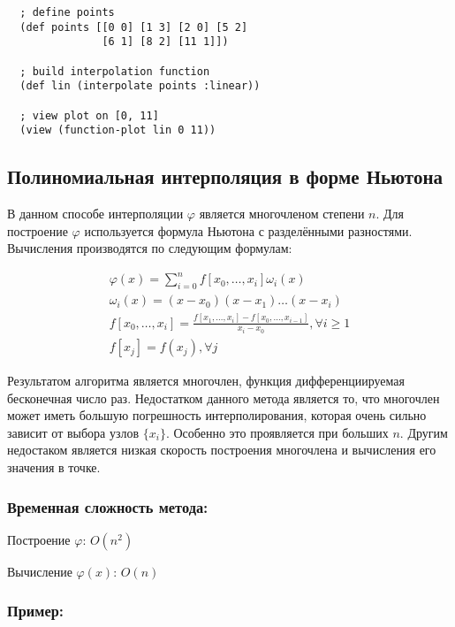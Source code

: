 \begin{verbatim}
  ; define points
  (def points [[0 0] [1 3] [2 0] [5 2] 
               [6 1] [8 2] [11 1]])

  ; build interpolation function
  (def lin (interpolate points :linear))

  ; view plot on [0, 11]
  (view (function-plot lin 0 11))
\end{verbatim}



\subsection{Полиномиальная интерполяция в форме Ньютона}

В данном способе интерполяции $\varphi$ является многочленом степени $n$. Для построение $\varphi$ используется формула Ньютона с разделёнными разностями. Вычисления производятся по следующим формулам:

\begin{equation}
  \begin{gathered}
    \varphi(x) = \sum_{i=0}^n f[x_0, \dotsc, x_i] \omega_i(x) \\
    \omega_i(x) = (x - x_0)(x - x_1) \dotsc (x - x_i) \\
    f[x_0, \dotsc, x_i] = \frac{f[x_1, \dotsc, x_i] - f[x_0, \dotsc, x_{i-1}]}{x_i - x_0}, \forall i \geq 1 \\
    f[x_j] = f(x_j), \forall j
  \end{gathered}
\end{equation}

Результатом алгоритма является многочлен, функция дифференциируемая бесконечная число раз. Недостатком данного метода является то, что многочлен может иметь большую погрешность интерполирования, которая очень сильно зависит от выбора узлов $\{x_i\}$. Особенно это проявляется при больших $n$. Другим недостаком является низкая скорость построения многочлена и вычисления его значения в точке.

\subsubsection{Временная сложность метода:}

Построение $\varphi$: $O(n^2)$

Вычисление $\varphi(x)$: $O(n)$

\subsubsection{Пример:}


